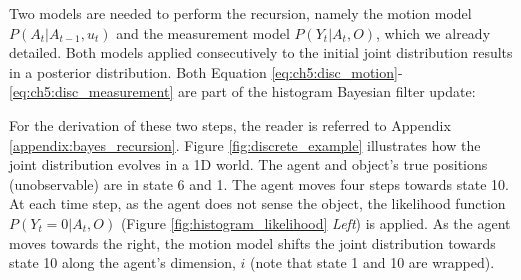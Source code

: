 Two models are needed to perform the recursion, namely the motion model $P(A_t|A_{t-1},u_t)$ and the measurement model
$P(Y_t|A_t,O)$, which we already detailed. Both models applied consecutively to the initial joint distribution results in a posterior
distribution. Both Equation \ref{eq:ch5:disc_motion}-\ref{eq:ch5:disc_measurement} are part of the histogram Bayesian filter 
update:

\begin{center}
%
\end{center}

For the derivation of these  two steps, the reader is referred to Appendix \ref{appendix:bayes_recursion}.
Figure \ref{fig:discrete_example} illustrates how the joint distribution evolves in a 1D world. 
The agent and object's true positions (unobservable) are in state 6 and 1. The agent moves four steps towards state 10. At each time 
step, as the agent does not sense the object, the likelihood function  $P(Y_t=0|A_t,O)$ (Figure \ref{fig:histogram_likelihood} \textit{Left})
is applied. As the agent moves towards the right, the motion model shifts the joint distribution towards state 10 along the agent's 
dimension, $i$ (note that state 1 and 10 are wrapped).

